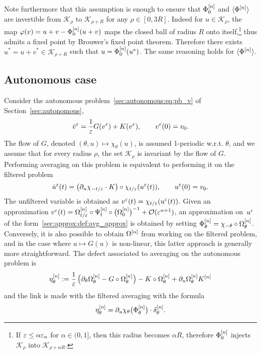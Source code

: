 %

Note furthermore that this assumption is enough to ensure that $\Phi^{[n]}
_0$ and $\langle \Phi^{[n]} \rangle$ are invertible from $\mathcal{K}_\rho$ to
$\mathcal{K}_{\rho + R}$ for any $\rho \in [0, 3R]$. Indeed for $u \in
\mathcal{K}_\rho$, the map $\varphi(v) = u + v - \Phi^{[n]} _0(u+v)$ maps
the closed ball of radius $R$ onto itself,\footnote{%
If $\varepsilon \leq \alpha \varepsilon_n$ for $\alpha \in (0,1]$, then this
radius becomes $\alpha R$, therefore $\Phi^{[n]} _0$ injects
$\mathcal{K}_\rho$ into $\mathcal{K}_{\rho + \alpha R}$. } %
thus admits a fixed point by Brouwer's fixed point theorem. Therefore
there exists $u^* = u + v^* \in \mathcal{K}_{\rho + R}$ such that $u =
\Phi^{[n]} _0 (u^*)$. The same reasoning holds for $\langle \Phi^{[n]} \rangle$. 


\subsection{Autonomous case}

Consider the autonomous problem~\eqref{sec:autonomous:eq:pb_v} of
Section~\ref{sec:autonomous}, 
\begin{equation*}
  \dot v^{\varepsilon} = \frac{1}{\varepsilon}G(v^{\varepsilon}) + K(v^{\varepsilon}),
  \qquad
  v^{\varepsilon}(0) = v_0 .
\end{equation*}
The flow of $G$, denoted $(\theta,u) \mapsto \chi_\theta(u)$, is assumed
1-periodic w.r.t. $\theta$, and we assume that for every radius $\rho$,
the set $\mathcal{K}_\rho$ is invariant by the flow of $G$. Performing
averaging on this problem is equivalent to performing it on the filtered
problem 
\begin{equation*}
  \dot u^{\varepsilon}(t) = \big( \partial_u \chi_{-t/\varepsilon} \cdot K \big) 
    \circ \chi_{t/\varepsilon} (u^{\varepsilon}(t)),
  \qquad
  u^{\varepsilon}(0) = v_0 .
\end{equation*}
The unfiltered variable is obtained as $v^{\varepsilon}(t) =
\chi_{t/\varepsilon}(u^{\varepsilon}(t) )$. Given an approximation $v^{\varepsilon}(t) = \Omega^{[n]} _{t/\varepsilon} \circ \Psi^{[n]} _t \circ \big( \Omega^{[n]} _0 \big)^{-1} +
\mathcal{O}(\varepsilon^{n+1} )$, an approximation on~$u^{\varepsilon}$ of the
form~\eqref{sec:approx:def:avg_approx} is obtained by setting $\Phi^{[n]}
_\theta = \chi_{-\theta} \circ \Omega^{[n]} _\theta$. Conversely, it is
also possible to obtain $\Omega^{[n]}$ from working on the filtered
problem, and in the case where $u \mapsto G(u)$ is non-linear, this latter
approach is generally more straightforward. The defect associated to 
averaging on the autonomous problem is 
\begin{equation} \label{sec:approx:def:eta}
  \eta^{[n]}_{\theta} 
  := \frac{1}{\varepsilon} \left( \partial_\theta \Omega^{[n]} _\theta 
  - G \circ \Omega^{[n]} _\theta \right) 
  - K \circ \Omega^{[n]} _\theta + \partial_u \Omega^{[n]} _\theta K^{[n]} 
\end{equation}
and the link is made with the filtered averaging with the formula 
\begin{equation*}
  \eta^{[n]} _\theta = \partial_u \chi _\theta \big( \Phi^{[n]} _\theta \big)
  \cdot \delta^{[n]} _\theta .
\end{equation*}



